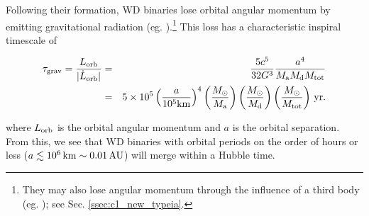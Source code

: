 




Following their formation, WD binaries lose orbital angular momentum by emitting gravitational radiation (eg. \citealt{petem63}).\footnote{They may also lose angular momentum through the influence of a third body (eg. \citealt{katzd12}); see Sec. \ref{ssec:c1_new_typeia}.}  This loss has a characteristic inspiral timescale of \citep{segrcm97}

\begin{eqnarray}
\tau_{\mrm{grav}} = \frac{L_\mrm{orb}}{|\dot{L}_\mrm{orb}|} &=& \frac{5c^5}{32G^3}\frac{a^4}{\Ma\Md\Mtot}\nonumber \\
&=&5 \times 10^5 \left(\frac{a}{10^5 \mrm{km}}\right)^4 \left(\frac{\Msun}{\Ma}\right) \left(\frac{\Msun}{\Md}\right) \left(\frac{\Msun}{\Mtot}\right)\,\mrm{yr}.
\label{eq:c1_gravtimescale}
\end{eqnarray}

\noindent where $L_\mathrm{orb}$ is the orbital angular momentum and $a$ is the orbital separation.  From this, we see that WD binaries with orbital periods on the order of hours or less ($a \lesssim 10^6\,\mathrm{km} \sim 0.01\,\mathrm{AU}$) will merge within a Hubble time.  


